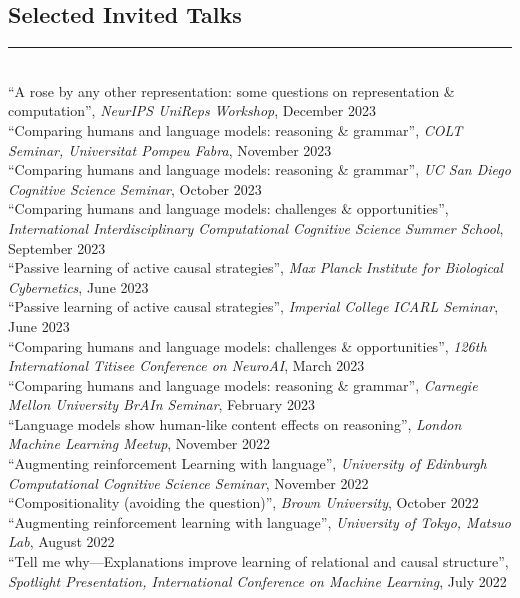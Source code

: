 \documentclass[margin]{res}
\begin{document}
\begin{resume}
\vspace{1pt}\section{Selected Invited Talks} \vspace{-15pt} \rule{\textwidth}{0.5pt} \\[3pt]
{``A rose by any other representation: some questions on representation \& computation'',} \textit{NeurIPS UniReps Workshop}, December 2023\\[3pt] 
{``Comparing humans and language models: reasoning \& grammar'',} \textit{COLT Seminar, Universitat Pompeu Fabra}, November 2023\\[3pt] 
{``Comparing humans and language models: reasoning \& grammar'',} \textit{UC San Diego Cognitive Science Seminar}, October 2023\\[3pt] 
{``Comparing humans and language models: challenges \& opportunities'',} \textit{International Interdisciplinary Computational Cognitive Science Summer School}, September 2023\\[3pt] 
{``Passive learning of active causal strategies'',} \textit{Max Planck Institute for Biological Cybernetics}, June 2023\\[3pt]
{``Passive learning of active causal strategies'',} \textit{Imperial College ICARL Seminar}, June 2023\\[3pt]
{``Comparing humans and language models: challenges \& opportunities'',} \textit{126th International Titisee Conference on NeuroAI}, March 2023\\[3pt] 
{``Comparing humans and language models: reasoning \& grammar'',} \textit{Carnegie Mellon University BrAIn Seminar}, February 2023\\[3pt] 
{``Language models show human-like content effects on reasoning'',} \textit{London Machine Learning Meetup}, November 2022\\[3pt] 
{``Augmenting reinforcement Learning with language'',} \textit{University of Edinburgh Computational Cognitive Science Seminar}, November 2022\\[3pt] 
{``Compositionality (avoiding the question)'',} \textit{Brown University}, October 2022\\[3pt] 
{``Augmenting reinforcement learning with language'',} \textit{University of Tokyo, Matsuo Lab}, August 2022\\[3pt] 
{``Tell me why---Explanations improve learning of relational and causal structure'',} \textit{Spotlight Presentation, International Conference on Machine Learning}, July 2022\\[3pt] 

\end{resume}
\end{document}
